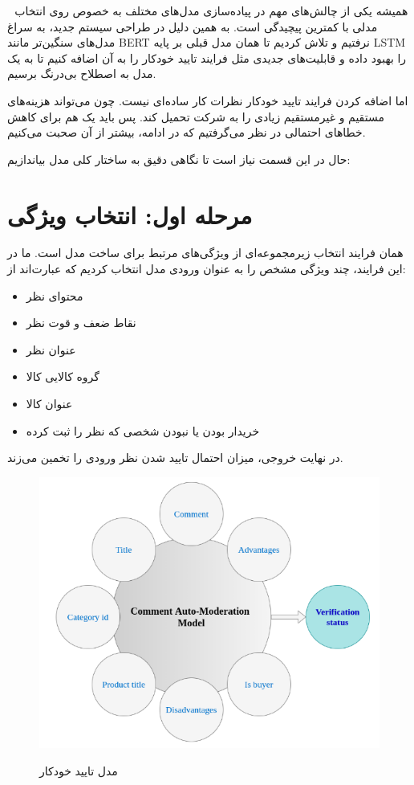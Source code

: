 

‌
‌
همیشه یکی از چالش‌های مهم در پیاده‌سازی مدل‌های مختلف به خصوص روی 
انتخاب مدلی با کمترین پیچیدگی است. به همین دلیل در طراحی سیستم جدید، به سراغ مدل‌های سنگین‌تر مانند
BERT
نرفتیم  و تلاش کردیم تا همان مدل قبلی بر پایه LSTM‌ را بهبود داده و قابلیت‌های جدیدی مثل فرایند تایید خودکار را به آن اضافه کنیم تا به یک مدل به اصطلاح بی‌درنگ برسیم.

اما اضافه کردن فرایند تایید خودکار نظرات کار ساده‌ای نیست. چون می‌تواند هزینه‌های مستقیم و غیرمستقیم زیادی را به شرکت تحمیل کند. پس باید یک 
هم برای کاهش خطاهای احتمالی در نظر می‌گرفتیم که در ادامه، بیشتر از آن صحبت می‌کنیم.

حال در این قسمت نیاز است تا نگاهی دقیق به ساختار کلی مدل بیاندازیم:

\section{مرحله اول: انتخاب ویژگی}

همان فرایند انتخاب زیرمجموعه‌ای از ویژگی‌های مرتبط برای ساخت مدل است. ما در این فرایند، چند ویژگی مشخص را به عنوان ورودی مدل انتخاب کردیم که عبارت‌اند از:

\begin{itemize}
    \item محتوای نظر
    \item نقاط ضعف و قوت نظر
    \item عنوان نظر
    \item گروه کالایی کالا
    \item عنوان کالا
    \item خریدار بودن یا نبودن شخصی که نظر را ثبت کرده

\end{itemize}

در نهایت خروجی، میزان احتمال تایید شدن نظر ورودی را تخمین می‌زند.

\begin{figure}[H]
\centering
\caption{مدل تایید خودکار}\label{}
\includegraphics[width=15cm]{figs/auto_moderation_model.png}
\label{fig:test}
\end{figure}


